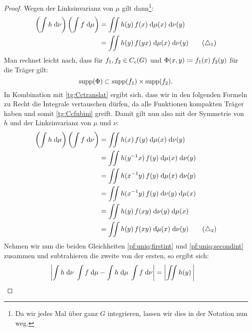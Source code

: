 \begin{proof}
    Wegen der Linksinvarianz von $\mu$ gilt dann\footnote{Da wir jedes Mal über ganz
    $G$ integrieren, lassen wir dies in der Notation nun weg.}:
    \begin{align*}
        \left( \int h \dif\nu \right) \left( \int f \dif\mu \right)     %
        &= \iint h(y) \, f(x) \dif{\mu(x)} \dif{\nu(y)}                 \\
        &= \iint h(y) \, f(yx) \dif{\mu(x)} \dif{\nu(y)}                %
        \label{pf:uniq:firstint} \tag{$\triangle_1$}
    \end{align*}
    Man rechnet leicht nach, dass für $f_1,f_2\in C_c(G)$ und
    $\Phi(x,y)\coloneqq f_1(x)\,f_2(y)$ für die Träger gilt: 
    \[ \operatorname{supp}(\Phi) \subset \operatorname{supp}(f_1) \times \operatorname{supp}(f_2)
    . \]
    In Kombination mit \cref{tg:Cctranslat} ergibt sich, dass wir in den
    folgenden Formeln zu Recht die Integrale vertauschen dürfen, da alle
    Funktionen kompakten Träger haben und somit \cref{tg:Ccfubini} greift.
    Damit gilt nun also mit der Symmetrie von~$h$ und der Linksinvarianz von
    $\mu$ und $\nu$:
    \begin{align*} 
        \left( \int h \dif\mu \right) \left( \int f \dif\nu \right)     %
        &= \iint h(x) \, f(y) \dif{\mu(x)} \dif{\nu(y)}                 \\
        &= \iint h(y^{-1}x) \, f(y) \dif{\mu(x)} \dif{\nu(y)}           \\
        &= \iint h(x^{-1}y) \, f(y) \dif{\mu(x)} \dif{\nu(y)}           \\
        &= \iint h(x^{-1}y) \, f(y) \dif{\nu(y)} \dif{\mu(x)}           \\
        &= \iint h(y) \, f(xy) \dif{\nu(y)} \dif{\mu(x)}                \\
        &= \iint h(y) \, f(xy) \dif{\mu(x)} \dif{\nu(y)}                %
        \label{pf:uniq:secondint} \tag{$\triangle_2$}
    \end{align*}
    Nehmen wir nun die beiden Gleichheiten \eqref{pf:uniq:firstint} und 
    \eqref{pf:uniq:secondint} zusammen und subtrahieren die zweite von der
    ersten, so ergibt sich:
    \begin{align*}
        \abs*{                                                              %
                \int h \dif\nu \; \int f \dif\mu                            %
            -   \int h \dif\mu \; \int f \dif\nu                            %
        }                                                                   %
        &= \abs*{ \iint h(y) \,                                             %
}
\end{align*}
\end{proof}
